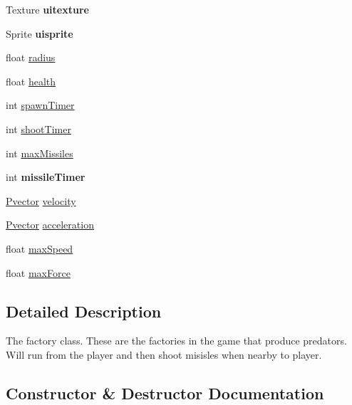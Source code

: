 \begin{DoxyCompactItemize}
\item 
Texture {\bfseries uitexture}\hypertarget{class_factory_aef6a1cf9132e8d06fdf28cb2d7ba8a63}{}\label{class_factory_aef6a1cf9132e8d06fdf28cb2d7ba8a63}

\item 
Sprite {\bfseries uisprite}\hypertarget{class_factory_afaffc9ae1e3d9bf6b841aa7b62866755}{}\label{class_factory_afaffc9ae1e3d9bf6b841aa7b62866755}

\item 
float \hyperlink{class_factory_a4a3444b334f5c7f53cf314dce9771170}{radius}
\item 
float \hyperlink{class_factory_a8f0438d0c9a26df91ddd51bcf5fab055}{health}
\item 
int \hyperlink{class_factory_a98898fd82bbede3f1d012b3f27dc7582}{spawn\+Timer}
\item 
int \hyperlink{class_factory_a7760f2b8585ba42e755fd2bcca51d317}{shoot\+Timer}
\item 
int \hyperlink{class_factory_a025dc63826c2a6d99eb9c2497d8b2e9c}{max\+Missiles}
\item 
int {\bfseries missile\+Timer}\hypertarget{class_factory_ac6d747abc9d722149e00ae42d1ab24ca}{}\label{class_factory_ac6d747abc9d722149e00ae42d1ab24ca}

\item 
\hyperlink{class_pvector}{Pvector} \hyperlink{class_factory_a221e6d7edc4f62594b03f1140a8eeafb}{velocity}
\item 
\hyperlink{class_pvector}{Pvector} \hyperlink{class_factory_acfd50e36e56632777b30ab2ba3be8c48}{acceleration}
\item 
float \hyperlink{class_factory_aa7bec46e699e843b75899c6311358370}{max\+Speed}
\item 
float \hyperlink{class_factory_ae3dd0fca70d57ab4919052d3c4728285}{max\+Force}
\end{DoxyCompactItemize}


\subsection{Detailed Description}
The factory class. These are the factories in the game that produce predators. Will run from the player and then shoot misisles when nearby to player. 

\subsection{Constructor \& Destructor Documentation}
